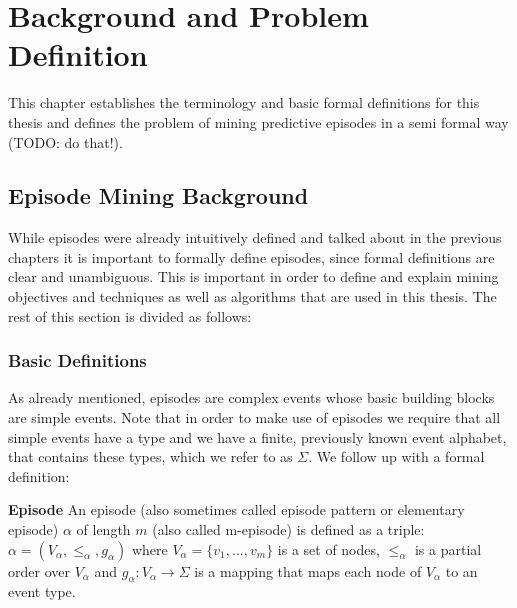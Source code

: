 \chapter{Background and Problem Definition}
\label{chapter_background}

\ifpdf
    \graphicspath{{Chapter3/Figs/Raster/}{Chapter3/Figs/PDF/}{Chapter3/Figs/}}
\else
    \graphicspath{{Chapter3/Figs/Vector/}{Chapter3/Figs/}}
\fi

This chapter establishes the terminology and basic formal definitions for this thesis and defines the problem of mining predictive episodes in a semi formal way (TODO: do that!).

\section{Episode Mining Background}
\label{sec_episodeMiningBackground}

While episodes were already intuitively defined and talked about in the previous chapters it is important to formally define episodes, since formal definitions are clear and unambiguous. This is important in order to define and explain mining objectives and techniques as well as algorithms that are used in this thesis. The rest of this section is divided as follows: %

\subsection{Basic Definitions}
\label{subsec_basicEpisodeDefinitions}
As already mentioned, episodes are complex events whose basic building blocks are simple events. Note that  in order to make use of episodes we require that all simple events have a type and we have a finite, previously known event alphabet, that contains these types, which we refer to as $\Sigma$. We follow up with a formal definition:

\begin{mydef}
\label{def_episode}
\textbf{Episode} An episode (also sometimes called episode pattern or elementary episode) $\alpha$ of length $m$ (also called m-episode) is defined as a triple: $\alpha = (V_\alpha,{\leq}_{\alpha},g_\alpha)$ where $V_\alpha = \{v_1,...,v_m\}$ is a set of nodes, ${\leq}_{\alpha}$ is a partial order over $V_\alpha$ and $g_\alpha : V_\alpha \rightarrow \Sigma$ is a mapping that maps each node of $V_\alpha$ to an event type. \cite{mannila1995discovering}
\end{mydef}

